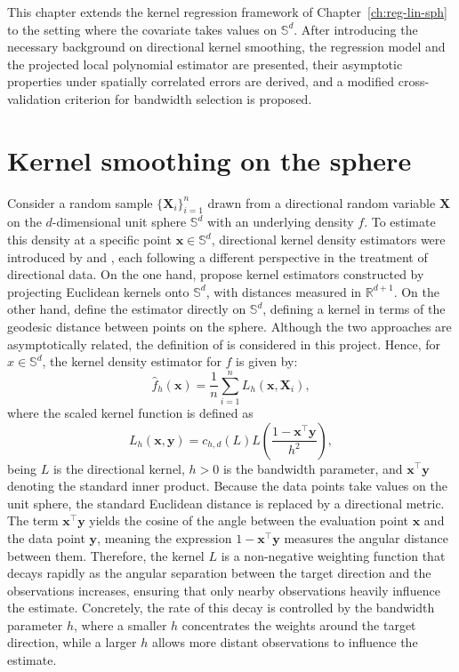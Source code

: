 \documentclass[12pt]{report} %
\newcommand{\bX}{\mathbf{X}}
\newcommand{\bx}{\mathbf{x}}
\newcommand{\by}{\mathbf{y}}
\newcommand{\Sd}{\mathbb{S}^{d}}
\begin{document}
This chapter extends the kernel regression framework of Chapter~\ref{ch:reg-lin-sph} to the setting where the covariate takes values on $\Sd$. After introducing the necessary background on
directional kernel smoothing, the regression model and the projected
local polynomial estimator are presented, their asymptotic properties under spatially correlated errors are derived, and a modified cross-validation criterion for bandwidth selection is proposed.


\section{Kernel smoothing on the sphere}

Consider a random sample $\{\bX_i\}_{i = 1}^{n}$ drawn from a directional random variable $\bX$ on the $d$-dimensional unit sphere $\Sd$ with an underlying density $f$. To estimate this density at a specific point $\bx \in \mathbb{S}^d$, directional kernel density estimators were introduced by \citet{Haldane1960} and \citet{Bai1988}, each following a different perspective in the treatment of directional data. On the one hand, \citet{Hall1987} propose kernel estimators constructed by projecting Euclidean kernels onto $\mathbb{S}^d$, with distances measured in $\mathbb{R}^{d+1}$. On the other hand, \citet{Bai1988} define the estimator directly on $\mathbb{S}^d$, defining a kernel in terms of the geodesic distance between points on the sphere. Although the two approaches are asymptotically related, the definition of \citet{Bai1988} is considered in this project. Hence, for $x \in \Sd$, the kernel density estimator for $f$ is given by: 
\begin{equation*}
    \hat{f}_h(\bx) = \frac{1}{n} \sum_{i=1}^n L_h(\bx, \bX_i),
\end{equation*}
where the scaled kernel function is defined as
\begin{equation}
    \label{eq:direct-kernel}
    L_h(\bx, \mathbf{y}) = c_{h,d}(L) L\left(\frac{1 - \bx^\top \mathbf{y}}{h^2}\right),
\end{equation}
being $L$ is the directional kernel, $h > 0$ is the bandwidth parameter, and $\bx^\top\by$ denoting the standard inner product. Because the data points take values on the unit sphere, the standard Euclidean distance is replaced by a directional metric. The term $\bx^\top\mathbf{y}$ yields the cosine of the angle between the evaluation point $\bx$ and the data point $\mathbf{y}$, meaning the expression $1 - \bx^\top\mathbf{y}$ measures the angular distance between them. Therefore, the kernel $L$ is a non-negative weighting function that decays rapidly as the angular separation between the target direction and the observations increases, ensuring that only nearby observations heavily influence the estimate. Concretely, the rate of this decay is controlled by the bandwidth parameter $h$, where a smaller $h$ concentrates the weights around the target direction, while a larger $h$ allows more distant observations to influence the estimate. 
\end{document}
